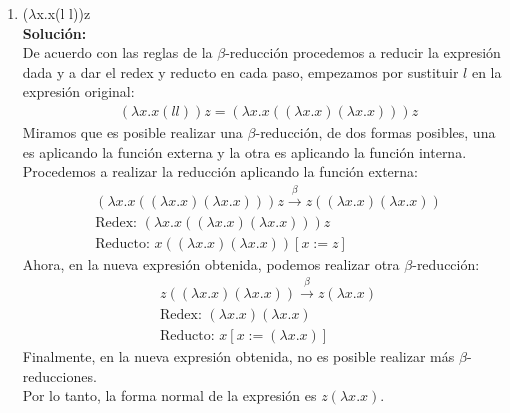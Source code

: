 \documentclass[11pt]{article}
\begin{document}
\begin{enumerate}[leftmargin=0.8cm]
\begin{enumerate}
        \item ($\lambda$x.x(l l))z \\
        \textbf{Solución:}\\
        De acuerdo con las reglas de la $\beta$-reducción procedemos a reducir la expresión dada y a dar el redex y reducto en cada paso, empezamos por sustituir $l$ en la expresión original:
        \begin{align*}
            & (\lambda x.x(l l))z = (\lambda x.x((\lambda x.x)(\lambda x.x)))z
        \end{align*}
        Miramos que es posible realizar una $\beta$-reducción, de dos formas posibles, una es aplicando la función externa y la otra es aplicando la función interna. Procedemos a realizar la reducción aplicando la función externa:
        \begin{align*}
            & (\lambda x.x((\lambda x.x)(\lambda x.x)))z \xrightarrow{\beta} z((\lambda x.x)(\lambda x.x))\\
            & \text{Redex: } (\lambda x.x((\lambda x.x)(\lambda x.x)))z\\
            & \text{Reducto: } x((\lambda x.x)(\lambda x.x))[x:=z]
        \end{align*}
        Ahora, en la nueva expresión obtenida, podemos realizar otra $\beta$-reducción:
        \begin{align*}
            & z((\lambda x.x)(\lambda x.x)) \xrightarrow{\beta} z(\lambda x.x)\\
            & \text{Redex: } (\lambda x.x)(\lambda x.x)\\
            & \text{Reducto: } x[x:= (\lambda x.x)]
        \end{align*}
        Finalmente, en la nueva expresión obtenida, no es posible realizar más $\beta$-reducciones.\\
        Por lo tanto, la forma normal de la expresión es $z(\lambda x.x)$.
        

    \end{enumerate}
\end{enumerate}
\end{document}
